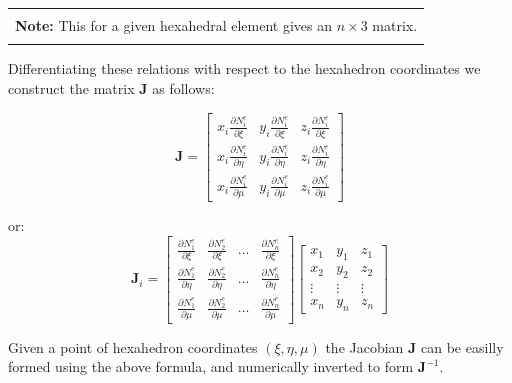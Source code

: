 \documentclass[10pt,b5paper,titlepage]{book}
\newcommand{\m}{\mathbf}
\newenvironment{bbox}[1][0.96]
{
    \begin{center}
        \begin{tabular}{|p{#1\textwidth}|}
            \hline\\
}
{
            \\\\\hline
        \end{tabular}
    \end{center}
}
\begin{document}
\begin{bbox}
    \textbf{Note:} This for a given hexahedral element gives an $ n \times 3 $ matrix.
\end{bbox}


Differentiating these relations with respect to the hexahedron coordinates we construct
the matrix $ \m{J} $ as follows:

\begin{equation}
    \m{J} =
    \begin{bmatrix}
        x_i \frac{\partial N_i^e}{\partial \xi} &
        y_i \frac{\partial N_i^e}{\partial \xi} &
        z_i \frac{\partial N_i^e}{\partial \xi}\\
        x_i \frac{\partial N_i^e}{\partial \eta} &
        y_i \frac{\partial N_i^e}{\partial \eta} &
        z_i \frac{\partial N_i^e}{\partial \eta}\\
        x_i \frac{\partial N_i^e}{\partial \mu} &
        y_i \frac{\partial N_i^e}{\partial \mu} &
        z_i \frac{\partial N_i^e}{\partial \mu}
    \end{bmatrix}
\end{equation}

or:
\begin{equation}
    \m{J}_i =
    \begin{bmatrix}
        \frac{\partial N_1^e}{\partial \xi} &
        \frac{\partial N_2^e}{\partial \xi} &
        \dots &
        \frac{\partial N_n^e}{\partial \xi}\\
        \frac{\partial N_1^e}{\partial \eta} &
        \frac{\partial N_2^e}{\partial \eta} &
        \dots &
        \frac{\partial N_n^e}{\partial \eta}\\
        \frac{\partial N_1^e}{\partial \mu} &
        \frac{\partial N_2^e}{\partial \mu} &
        \dots &
        \frac{\partial N_n^e}{\partial \mu}
    \end{bmatrix}
    \begin{bmatrix}
        x_1 & y_1 & z_1 \\
        x_2 & y_2 & z_2 \\
        \vdots & \vdots & \vdots \\
        x_n & y_n & z_n
    \end{bmatrix}
\end{equation}


Given a point of hexahedron coordinates $ ( \xi, \eta, \mu ) $ the Jacobian $ \m{J} $
can be easilly formed using the above formula, and numerically inverted to form
$ \m{J}^{-1} $.
\end{document}
